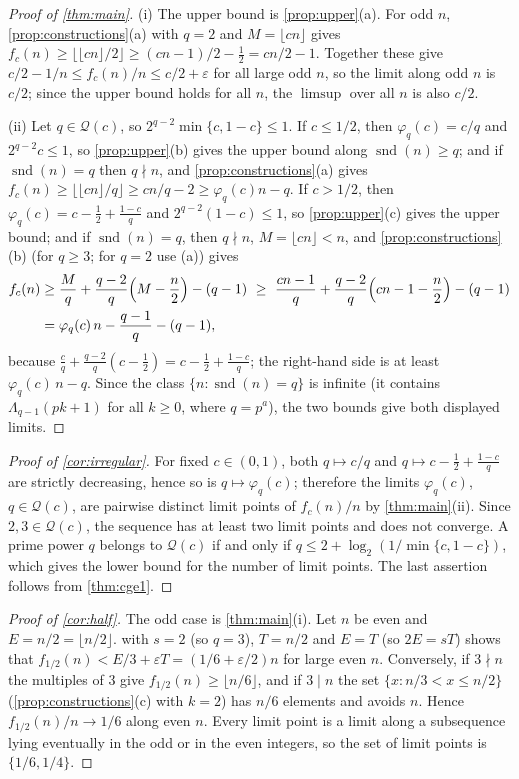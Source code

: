 \documentclass[11pt,reqno]{amsart}
\numberwithin{equation}{section}
\theoremstyle{definition}
\theoremstyle{remark}
\newcommand{\eps}{\varepsilon}
\newcommand{\floor}[1]{\lfloor #1\rfloor}
\newcommand{\snd}{\operatorname{snd}}
\begin{document}
\begin{proof}[Proof of \cref{thm:main}]
(i) The upper bound is \cref{prop:upper}(a). For odd $n$, \cref{prop:constructions}(a) with $q=2$ and $M=\floor{cn}$ gives $f_c(n)\ge\floor{\floor{cn}/2}\ge(cn-1)/2-\frac12=cn/2-1$. Together these give $c/2-1/n\le f_c(n)/n\le c/2+\eps$ for all large odd $n$, so the limit along odd $n$ is $c/2$; since the upper bound holds for all $n$, the $\limsup$ over all $n$ is also $c/2$.

(ii) Let $q\in\mathcal Q(c)$, so $2^{q-2}\min\{c,1-c\}\le1$. If $c\le1/2$, then $\varphi_q(c)=c/q$ and $2^{q-2}c\le1$, so \cref{prop:upper}(b) gives the upper bound along $\snd(n)\ge q$; and if $\snd(n)=q$ then $q\nmid n$, and \cref{prop:constructions}(a) gives $f_c(n)\ge\floor{\floor{cn}/q}\ge cn/q-2\ge\varphi_q(c)n-q$. If $c>1/2$, then $\varphi_q(c)=c-\frac12+\frac{1-c}q$ and $2^{q-2}(1-c)\le1$, so \cref{prop:upper}(c) gives the upper bound; and if $\snd(n)=q$, then $q\nmid n$, $M=\floor{cn}<n$, and \cref{prop:constructions}(b) (for $q\ge3$; for $q=2$ use (a)) gives
\begin{align*}
 f_c(n)&\ge\frac Mq+\frac{q-2}q\Bigl(M-\frac n2\Bigr)-(q-1)
 \ \ge\ \frac{cn-1}q+\frac{q-2}q\Bigl(cn-1-\frac n2\Bigr)-(q-1)\\
 &=\varphi_q(c)\,n-\frac{q-1}q-(q-1),
\end{align*}
because $\frac cq+\frac{q-2}q(c-\frac12)=c-\frac12+\frac{1-c}q$; the right-hand side is at least $\varphi_q(c)\,n-q$. Since the class $\{n:\snd(n)=q\}$ is infinite (it contains $\Lambda_{q-1}(pk+1)$ for all $k\ge0$, where $q=p^a$), the two bounds give both displayed limits.
\end{proof}

\begin{proof}[Proof of \cref{cor:irregular}]
For fixed $c\in(0,1)$, both $q\mapsto c/q$ and $q\mapsto c-\frac12+\frac{1-c}q$ are strictly decreasing, hence so is $q\mapsto\varphi_q(c)$; therefore the limits $\varphi_q(c)$, $q\in\mathcal Q(c)$, are pairwise distinct limit points of $f_c(n)/n$ by \cref{thm:main}(ii). Since $2,3\in\mathcal Q(c)$, the sequence has at least two limit points and does not converge. A prime power $q$ belongs to $\mathcal Q(c)$ if and only if $q\le2+\log_2(1/\min\{c,1-c\})$, which gives the lower bound for the number of limit points. The last assertion follows from \cref{thm:cge1}.
\end{proof}

\begin{proof}[Proof of \cref{cor:half}]
The odd case is \cref{thm:main}(i). Let $n$ be even and $E=n/2=\floor{n/2}$.  with $s=2$ (so $q=3$), $T=n/2$ and $E=T$ (so $2E=sT$) shows that $f_{1/2}(n)<E/3+\eps T=(1/6+\eps/2)n$ for large even $n$. Conversely, if $3\nmid n$ the multiples of $3$ give $f_{1/2}(n)\ge\floor{n/6}$, and if $3\mid n$ the set $\{x:n/3<x\le n/2\}$ (\cref{prop:constructions}(c) with $k=2$) has $n/6$ elements and avoids $n$. Hence $f_{1/2}(n)/n\to1/6$ along even $n$. Every limit point is a limit along a subsequence lying eventually in the odd or in the even integers, so the set of limit points is $\{1/6,1/4\}$.
\end{proof}
\end{document}
